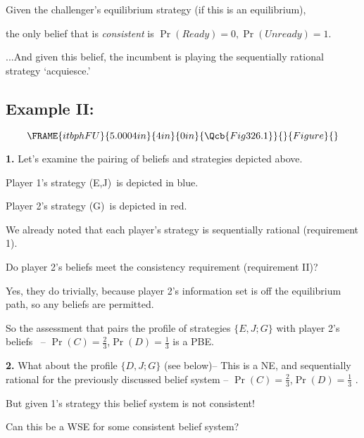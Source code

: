 \documentclass{article}
\begin{document}
Given the challenger's equilibrium strategy (if this is an equilibrium), 

the only belief that is \textit{consistent} is $\Pr (Ready)=0,\Pr
(Unready)=1.$

\bigskip 

...And given this belief, the incumbent is playing the sequentially rational
strategy `acquiesce.'

\bigskip 

\bigskip 

\subsection{Example II:\ }

\[
\FRAME{itbphFU}{5.0004in}{4in}{0in}{\Qcb{Fig 326.1}}{}{Figure}{\special%
{language "Scientific Word";type "GRAPHIC";maintain-aspect-ratio
TRUE;display "USEDEF";valid_file "T";width 5.0004in;height 4in;depth
0in;original-width 5.1515in;original-height 4.8161in;cropleft "0";croptop
"1";cropright "1";cropbottom "0";tempfilename
'JSH9C620.wmf';tempfile-properties "XPR";}} 
\]

\textbf{1. }Let's examine the pairing of beliefs and strategies depicted
above. \ 

Player 1's strategy (E,J)\ is depicted in blue.

Player 2's strategy (G)\ is depicted in red. \ 

We already noted that each player's strategy is sequentially rational
(requirement 1).

Do player 2's beliefs meet the consistency requirement (requirement II)?

Yes, they do trivially, because player 2's information set is off the
equilibrium path, so any beliefs are permitted.

So the assessment that pairs the profile of strategies $\{E,J;G\}$ with
player 2's beliefs \ -- $\Pr (C)=\frac{2}{3}$,$\Pr (D)=\frac{1}{3}$ is a PBE.

\bigskip 

\bigskip 

\textbf{2. }What about the profile $\{D,J;G\}$ (see below)-- This is a NE,
and sequentially rational for the previously discussed belief system -- $\Pr
(C)=\frac{2}{3}$,$\Pr (D)=\frac{1}{3}$ .

But given 1's strategy this belief system is not consistent! \ 

Can this be a WSE for some consistent belief system?
\end{document}
